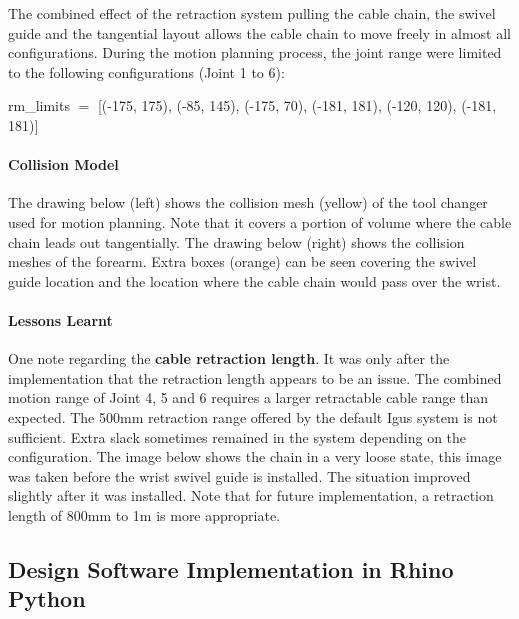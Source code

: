 The combined effect of the retraction system pulling the cable chain, the swivel guide and the tangential layout allows the cable chain to move freely in almost all configurations. During the motion planning process, the joint range were limited to the following configurations (Joint 1 to 6):

{\footnotesize rm\_limits $=$ [(-175, 175), (-85, 145), (-175, 70), (-181, 181), (-120, 120), (-181, 181)]}





\paragraph{Collision Model}

The drawing below (left) shows the collision mesh (yellow) of the tool changer used for motion planning. Note that it covers a portion of volume where the cable chain leads out tangentially. The drawing below (right) shows the collision meshes of the forearm. Extra boxes (orange) can be seen covering the swivel guide location and the location where the cable chain would pass over the wrist.



\paragraph{Lessons Learnt}

One note regarding the \textbf{cable retraction length}. It was only after the implementation that the retraction length appears to be an issue. The combined motion range of Joint 4, 5 and 6 requires a larger retractable cable range than expected. The 500mm retraction range offered by the default Igus system is not sufficient. Extra slack sometimes remained in the system depending on the configuration. The image below shows the chain in a very loose state, this image was taken before the wrist swivel guide is installed. The situation improved slightly after it was installed. Note that for future implementation, a retraction length of 800mm to 1m is more appropriate.



\subsection{Design Software Implementation in Rhino Python}
\label{subsection:exploration-3-design-software-implementation-in-rhino-python}


